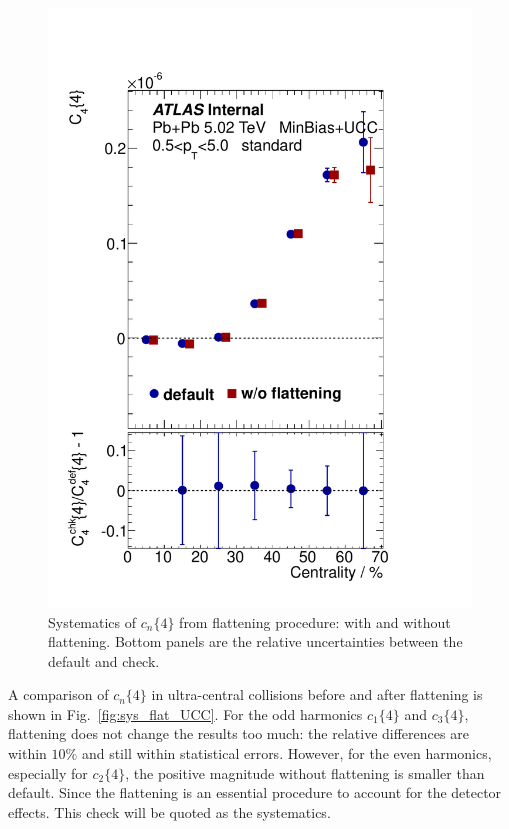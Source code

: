 \begin{figure}[H]
\includegraphics[width=.245\linewidth]{figs/sec_appendix/sys_PbPb502/PbPb502_sys11_1sub_Har4_Pt0.pdf}
\caption{Systematics of $c_n\{4\}$ from flattening procedure: with and without flattening. Bottom panels are the relative uncertainties between the default and check.}
\label{fig:sys_flat}
\end{figure}

A comparison of $c_n\{4\}$ in ultra-central collisions before and after flattening is shown in Fig.~\ref{fig:sys_flat_UCC}. For the odd harmonics $c_1\{4\}$ and $c_3\{4\}$, flattening does not change the results too much: the relative differences are within $10\%$ and still within statistical errors. However, for the even harmonics, especially for $c_2\{4\}$, the positive magnitude without flattening is smaller than default. Since the flattening is an essential procedure to account for the detector effects. This check will be quoted as the systematics.
